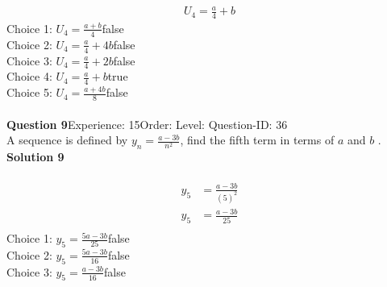 \documentclass{article}
\begin{document}
\\[-35pt]\begin{align*}
U_4=\displaystyle\frac{a}{4}+b
\end{align*}
Choice 1: \hspace{20pt}$U_4=\displaystyle\frac{a+b}{4}$\hspace{20pt}false\\
Choice 2: \hspace{20pt}$U_4=\displaystyle\frac{a}{4}+4b$\hspace{20pt}false\\
Choice 3: \hspace{20pt}$U_4=\displaystyle\frac{a}{4}+2b$\hspace{20pt}false\\
Choice 4: \hspace{20pt}$U_4=\displaystyle\frac{a}{4}+b$\hspace{20pt}true\\
Choice 5: \hspace{20pt}$U_4=\displaystyle\frac{a+4b}{8}$\hspace{20pt}false\\
\\[4pt]
\noindent\textbf{Question 9}\hspace{20pt}Experience: 15\hspace{20pt}Order: \hspace{20pt}Level: \hspace{20pt}Question-ID: 36\\[2pt]
A sequence is defined by $y_n=\displaystyle\frac{a-3b}{n^2}$, find the fifth term in terms of $a$ and $b$ .\\[4pt]
\noindent\textbf{Solution 9}\\[2pt]
\\[-35pt]\begin{align*}
y_5&=\displaystyle\frac{a-3b}{(5)^2}\\[2pt]
y_5&=\displaystyle\frac{a-3b}{25}\\[2pt]
\end{align*}
Choice 1: \hspace{20pt}$y_5=\displaystyle\frac{5a-3b}{25}$\hspace{20pt}false\\
Choice 2: \hspace{20pt}$y_5=\displaystyle\frac{5a-3b}{16}$\hspace{20pt}false\\
Choice 3: \hspace{20pt}$y_5=\displaystyle\frac{a-3b}{16}$\hspace{20pt}false\\
\end{document}
